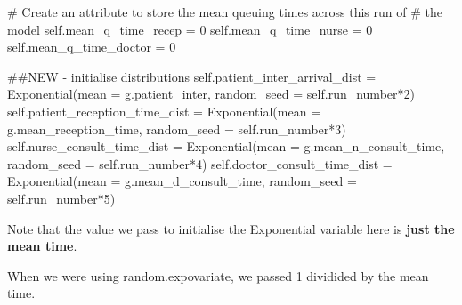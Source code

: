 \documentclass[
  letterpaper,
  DIV=11,
  numbers=noendperiod]{scrreprt}
\newenvironment{Shaded}{\begin{snugshade}}{\end{snugshade}}
\newcommand{\CommentTok}[1]{\textcolor[rgb]{0.37,0.37,0.37}{#1}}
\newcommand{\DecValTok}[1]{\textcolor[rgb]{0.68,0.00,0.00}{#1}}
\newcommand{\NormalTok}[1]{\textcolor[rgb]{0.00,0.23,0.31}{#1}}
\newcommand{\OperatorTok}[1]{\textcolor[rgb]{0.37,0.37,0.37}{#1}}
\newcommand{\VariableTok}[1]{\textcolor[rgb]{0.07,0.07,0.07}{#1}}
\begin{document}
\begin{Shaded}
\begin{Highlighting}[]
        \CommentTok{\# Create an attribute to store the mean queuing times across this run of}
        \CommentTok{\# the model}
        \VariableTok{self}\NormalTok{.mean\_q\_time\_recep }\OperatorTok{=} \DecValTok{0}
        \VariableTok{self}\NormalTok{.mean\_q\_time\_nurse }\OperatorTok{=} \DecValTok{0}
        \VariableTok{self}\NormalTok{.mean\_q\_time\_doctor }\OperatorTok{=} \DecValTok{0}

        \CommentTok{\#\#NEW {-} initialise distributions}
        \VariableTok{self}\NormalTok{.patient\_inter\_arrival\_dist }\OperatorTok{=}\NormalTok{ Exponential(mean }\OperatorTok{=}\NormalTok{ g.patient\_inter, random\_seed }\OperatorTok{=} \VariableTok{self}\NormalTok{.run\_number}\OperatorTok{*}\DecValTok{2}\NormalTok{)}
        \VariableTok{self}\NormalTok{.patient\_reception\_time\_dist }\OperatorTok{=}\NormalTok{ Exponential(mean }\OperatorTok{=}\NormalTok{ g.mean\_reception\_time, random\_seed }\OperatorTok{=} \VariableTok{self}\NormalTok{.run\_number}\OperatorTok{*}\DecValTok{3}\NormalTok{)}
        \VariableTok{self}\NormalTok{.nurse\_consult\_time\_dist }\OperatorTok{=}\NormalTok{ Exponential(mean }\OperatorTok{=}\NormalTok{ g.mean\_n\_consult\_time, random\_seed }\OperatorTok{=} \VariableTok{self}\NormalTok{.run\_number}\OperatorTok{*}\DecValTok{4}\NormalTok{)}
        \VariableTok{self}\NormalTok{.doctor\_consult\_time\_dist }\OperatorTok{=}\NormalTok{ Exponential(mean }\OperatorTok{=}\NormalTok{ g.mean\_d\_consult\_time, random\_seed }\OperatorTok{=} \VariableTok{self}\NormalTok{.run\_number}\OperatorTok{*}\DecValTok{5}\NormalTok{)}
\end{Highlighting}
\end{Shaded}

\begin{tcolorbox}[enhanced jigsaw, rightrule=.15mm, colback=white, colframe=quarto-callout-warning-color-frame, colbacktitle=quarto-callout-warning-color!10!white, toprule=.15mm, coltitle=black, opacityback=0, titlerule=0mm, bottomtitle=1mm, breakable, title=\textcolor{quarto-callout-warning-color}{\faExclamationTriangle}\hspace{0.5em}{Warning}, opacitybacktitle=0.6, toptitle=1mm, arc=.35mm, bottomrule=.15mm, leftrule=.75mm, left=2mm]

Note that the value we pass to initialise the Exponential variable here
is \textbf{just the mean time}.

When we were using random.expovariate, we passed 1 dividided by the mean
time.

\end{tcolorbox}
\end{document}
